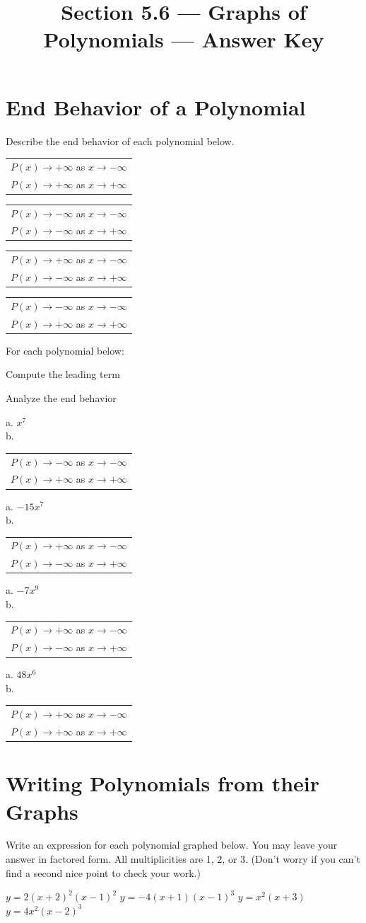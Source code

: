 

\title{Section 5.6 --- Graphs of Polynomials --- Answer Key}

\newcommand{\Ends}[2]{\begin{tabular}[t]{@{}l}$P(x)\rightarrow #1\infty$ as $x\rightarrow-\infty$\\$P(x)\rightarrow #2\infty$ as $x\rightarrow+\infty$\end{tabular}}
\newcommand{\ltends}[3]{a. $#1$\\b. \Ends{#2}{#3}}


\maketitle

\section*{End Behavior of a Polynomial}
Describe the end behavior of each polynomial below.
\begin{smenum}
\mitemxx
{\Ends{+}{+}}
{\Ends{-}{-}}
\mitemxx
{\Ends{+}{-}}
{\Ends{-}{+}}
\end{smenum}
For each polynomial below:
\begin{clist}
\item Compute the leading term
\item Analyze the end behavior
\end{clist}
\begin{smenum}
\mitemxx
{\ltends{x^7}{-}{+}}
{\ltends{-15x^7}{+}{-}}
\mitemxx
{\ltends{-7x^9}{+}{-}}
{\ltends{48x^6}{+}{+}}
\end{smenum}

\section*{Writing Polynomials from their Graphs}
Write an expression for each polynomial graphed below. You may leave your answer in factored form. All multiplicities are 1, 2, or 3. (Don't worry if you can't find a second nice point to check your work.)
\begin{smenum}
\mitemxx
{$y=2(x+2)^2(x-1)^2$}
{$y=-4(x+1)(x-1)^3$}
\mitemxx
{$y=x^2(x+3)$}
{$y=4x^2(x-2)^3$}
\end{smenum}
